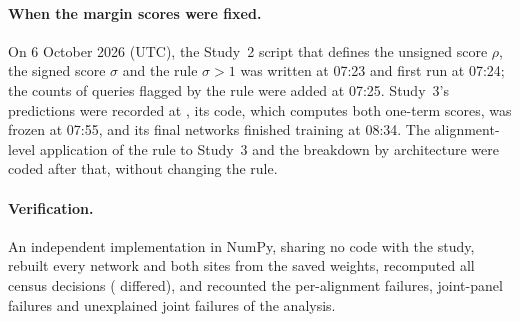 \paragraph{When the margin scores were fixed.}
On 6 October 2026 (UTC), the Study~2 script that defines the unsigned score $\rho$, the signed score $\sigma$ and the
rule $\sigma>1$ was written at 07:23 and first run at 07:24; the counts of queries flagged by the rule were added at
07:25. Study~3's predictions were recorded at \MsPredictionsTime, its code, which computes both one-term scores, was
frozen at 07:55, and its final networks finished training at 08:34. The alignment-level application of the rule to
Study~3 and the breakdown by architecture were coded after that, without changing the rule.

\paragraph{Verification.}
An independent implementation in NumPy, sharing no code with the study, rebuilt every network and both sites from the
saved weights, recomputed all \MsVerifiedDecisions{} census decisions (\MsVerifiedDiffer{} differed), and recounted
the per-alignment failures, joint-panel failures and unexplained joint failures of the analysis.
